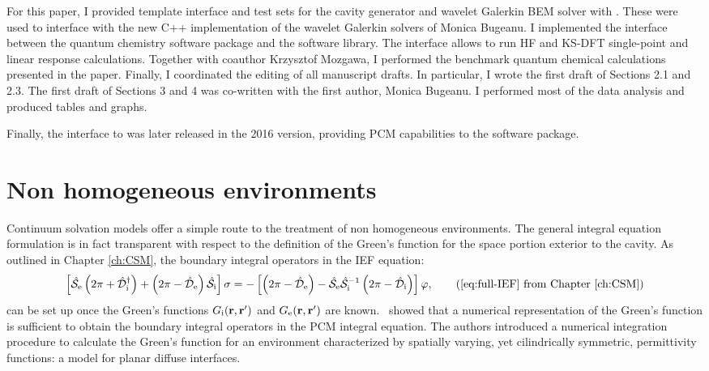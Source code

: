 For this paper, I provided template interface and test sets for the cavity
generator\autocite{Harbrecht2009-no, Harbrecht2011-dk} and wavelet Galerkin
\acs{BEM} solver\autocite{Harbrecht2004-uo, Harbrecht2006-ug} with \pcmsolver.
These were used to interface with the new C++ implementation of the wavelet
Galerkin solvers of Monica Bugeanu.
I implemented the interface between the \LSDALTON quantum chemistry software
package and the \pcmsolver software library. The interface allows to run \acs{HF} and
\acs{KS}-\acs{DFT} single-point and linear response calculations.
Together with coauthor Krzysztof Mozgawa, I performed the benchmark quantum
chemical calculations presented in the paper.
Finally, I coordinated the editing of all manuscript drafts.
In particular, I wrote the first draft of Sections 2.1 and 2.3.
The first draft of Sections 3 and 4 was co-written with the first author, Monica Bugeanu.
I performed most of the data analysis and produced tables and graphs.

Finally, the interface to \LSDALTON was later released in the 2016 version,
providing \acs{PCM} capabilities to the software package.

\section{Non homogeneous environments}\label{sec:spherical}

Continuum solvation models offer a simple route to the treatment of non
homogeneous environments.
The general integral equation formulation is in fact transparent with respect
to the definition of the Green's function for the space portion exterior to the
cavity.
As outlined in Chapter \ref{ch:CSM}, the boundary integral operators in the
\acs{IEF} equation:
\begin{equation}
  \left[ \bi{S}_\mathrm{e}\left(2\pi + \bi{D}^\dagger_\mathrm{i}\right)
  +
  \left(2\pi - \bi{D}_\mathrm{e}\right)\bi{S}_\mathrm{i}
  \right]\sigma =
  -\left[\left(2\pi-\bi{D}_\mathrm{e}\right)
  -\bi{S}_\mathrm{e}\bi{S}_\mathrm{i}^{-1}
  \left(2\pi-\bi{D}_\mathrm{i}\right)
  \right]\esp,
  \tag{\ref{eq:full-IEF} from Chapter \ref{ch:CSM}}
\end{equation}
can be set up once the Green's functions $G_\mathrm{i}(\mathbf{r}, \mathbf{r}^\prime)$ and $G_\mathrm{e}(\mathbf{r}, \mathbf{r}^\prime)$ are known.~\autocite{Cances1998-og}
\citeauthor{Frediani2004-er} showed that a numerical representation of the
Green's function is sufficient to obtain the boundary integral operators in the
\acs{PCM} integral equation.
The authors introduced a numerical integration procedure to calculate the
Green's function for an environment characterized by spatially varying, yet
cilindrically symmetric, permittivity functions: a model for planar diffuse interfaces.

